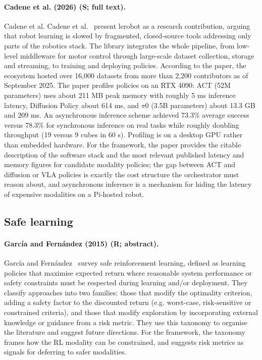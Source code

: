 \documentclass[10pt,a4paper]{article}
\begin{document}
\paragraph{Cadene et al. (2026) (S; full text).} Cadene et al. Cadene et al.~\cite{Cadene2026} present lerobot as a research contribution, arguing that robot learning is slowed by fragmented, closed-source tools addressing only parts of the robotics stack. The library integrates the whole pipeline, from low-level middleware for motor control through large-scale dataset collection, storage and streaming, to training and deploying policies. According to the paper, the ecosystem hosted over 16,000 datasets from more than 2,200 contributors as of September 2025. The paper profiles policies on an RTX 4090: ACT (52M parameters) uses about 211 MB peak memory with roughly 5 ms inference latency, Diffusion Policy about 614 ms, and $\pi$0 (3.5B parameters) about 13.3 GB and 209 ms. An asynchronous inference scheme achieved 73.3\% average success versus 78.3\% for synchronous inference on real tasks while roughly doubling throughput (19 versus 9 cubes in 60 s). Profiling is on a desktop GPU rather than embedded hardware. For the framework, the paper provides the citable description of the software stack and the most relevant published latency and memory figures for candidate modality policies; the gap between ACT and diffusion or VLA policies is exactly the cost structure the orchestrator must reason about, and asynchronous inference is a mechanism for hiding the latency of expensive modalities on a Pi-hosted robot.

\subsection*{Safe learning}
\paragraph{García and Fernández (2015) (R; abstract).} García and Fernández~\cite{Garcia2015} survey safe reinforcement learning, defined as learning policies that maximise expected return where reasonable system performance or safety constraints must be respected during learning and/or deployment. They classify approaches into two families: those that modify the optimality criterion, adding a safety factor to the discounted return (e.g. worst-case, risk-sensitive or constrained criteria), and those that modify exploration by incorporating external knowledge or guidance from a risk metric. They use this taxonomy to organise the literature and suggest future directions. For the framework, the taxonomy frames how the RL modality can be constrained, and suggests risk metrics as signals for deferring to safer modalities.
\end{document}
